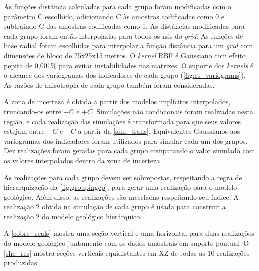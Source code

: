 As funções distância calculadas para cada grupo foram modificadas com o parâmetro C escolhido, adicionando C às amostras codificadas como 0 e subtraindo C das amostras codificadas como 1. As distâncias modificadas para cada grupo foram então interpoladas para todos os nós do \textit{grid}. As funções de base radial foram escolhidas para interpolar a função distância para um \textit{grid} com dimensões de bloco de 25x25x15 metros. O \textit{kernel} RBF é Gaussiano com efeito pepita de 0,001\% para evitar instabilidades nas matrizes. O suporte dos \textit{kernels} é o alcance dos variogramas dos indicadores de cada grupo (\autoref{fig:cs_variograms}). As razões de anisotropia de cada grupo também foram consideradas.

A zona de incerteza é obtida a partir dos modelos implícitos interpolados, truncando-os entre $-C$ e $+C$. Simulações não condicionais foram realizadas nesta região, e cada realização das simulações é transformada para que seus valores estejam entre $-C$ e $+ C$ a partir da \autoref{sim_trans}. Equivalentes Gaussianos aos variogramas dos indicadores foram utilizados para simular cada um dos grupos. Dez realizações foram geradas para cada grupo comparando o valor simulado com os valores interpolados dentro da zona de incerteza.

As realizações para cada grupo devem ser sobrepostas, respeitando a regra de hierarquização da \autoref{fig:groupingcp}, para gerar uma realização para o modelo geológico. Além disso, as realizações são mescladas respeitando seu índice. A realização 2 obtida na simulação de cada grupo é usada para construir a realização 2 do modelo geológico hierárquico.

A \autoref{cobre_reals} mostra uma seção vertical e uma horizontal para duas realizações do modelo geológico juntamente com os dados amostrais em suporte pontual. O \autoref{shc_res} mostra seções verticais equidistantes em XZ de todas as 10 realizações produzidas.


